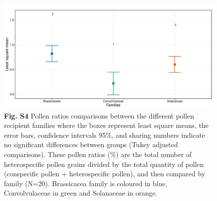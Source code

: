 \documentclass[
  12pt,
]{article}
\begin{document}
\begin{figure}
\centering
\includegraphics{Supp_Material_files/figure-latex/unnamed-chunk-7-1.pdf}
\caption{\textbf{Fig. S4} Pollen ratios comparisons between the
different pollen recipient families where the boxes represent least
square means, the error bars, confidence intervals 95\%, and sharing
numbers indicate no significant differences between groups (Tukey
adjusted comparisons). These pollen ratios (\%) are the total number of
heterospecific pollen grains divided by the total quantity of pollen
(conspecific pollen + heterospecific pollen), and then compared by
family (N=20). Brassicacea family is coloured in blue, Convolvulaceae in
green and Solanaceae in orange.}
\end{figure}

\newpage
\end{document}
